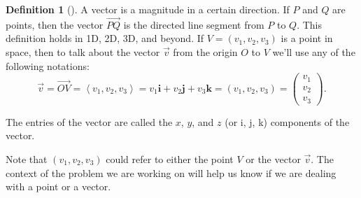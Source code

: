 \documentclass[10pt,]{book}
\theoremstyle{plain}
\theoremstyle{definition}
\newtheorem{definition}[theorem]{Definition}
\theoremstyle{definition}
\theoremstyle{definition}
\theoremstyle{definition}
\theoremstyle{definition}
\numberwithin{equation}{section}
\newcommand{\lt}{<}
\begin{document}
\begin{definition}[{}]\label{definition-2}
A vector is a magnitude in a certain direction. If \(P\) and \(Q\) are points, then the vector \(\vec{PQ}\) is the directed line segment from \(P\) to \(Q\). This definition holds in 1D, 2D, 3D, and beyond. If \(V=(v_1,v_2,v_3)\) is a point in space, then to talk about the vector \(\vec v\) from the origin \(O\) to \(V\) we'll use any of the following notations:%
\begin{equation*}
\vec v = \vec{OV}=\left\lt v_1,v_2,v_3\right> 
= v_1\mathbf{i}+v_2\mathbf{j}+v_3\mathbf{k} 
= (v_1,v_2,v_3) 
= \begin{pmatrix}v_1\\ v_2\\ v_3
\end{pmatrix} 
.
\end{equation*}
%
\par
The entries of the vector are called the \(x\), \(y\), and \(z\) (or i, j, k) components of the vector.%
\end{definition}
Note that \((v_1,v_2,v_3)\) could refer to either the point \(V\) or the vector \(\vec v\). The context of the problem we are working on will help us know if we are dealing with a point or a vector.%
\typeout{************************************************}
\typeout{************************************************}
\end{document}
